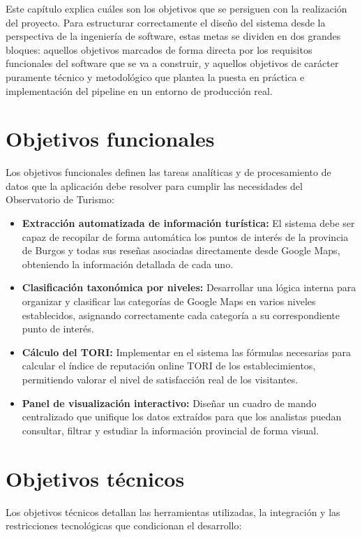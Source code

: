 
Este capítulo explica cuáles son los objetivos que se persiguen con la realización del proyecto. Para estructurar correctamente el diseño del sistema desde la perspectiva de la ingeniería de software, estas metas se dividen en dos grandes bloques: aquellos objetivos marcados de forma directa por los requisitos funcionales del software que se va a construir, y aquellos objetivos de carácter puramente técnico y metodológico que plantea la puesta en práctica e implementación del pipeline en un entorno de producción real.

\section{Objetivos funcionales}
Los objetivos funcionales definen las tareas analíticas y de procesamiento de datos que la aplicación debe resolver para cumplir las necesidades del Observatorio de Turismo:

\begin{itemize}
    \item \textbf{Extracción automatizada de información turística:} El sistema debe ser capaz de recopilar de forma automática los puntos de interés de la provincia de Burgos y todas sus reseñas asociadas directamente desde Google Maps, obteniendo la información detallada de cada uno.
    \item \textbf{Clasificación taxonómica por niveles:} Desarrollar una lógica interna para organizar y clasificar las categorías de Google Maps en varios niveles establecidos, asignando correctamente cada categoría a su correspondiente punto de interés.
    \item \textbf{Cálculo del TORI:} Implementar en el sistema las fórmulas necesarias para calcular el índice de reputación online TORI de los establecimientos, permitiendo valorar el nivel de satisfacción real de los visitantes.
    \item \textbf{Panel de visualización interactivo:} Diseñar un cuadro de mando centralizado que unifique los datos extraídos para que los analistas puedan consultar, filtrar y estudiar la información provincial de forma visual.
\end{itemize}

\section{Objetivos técnicos}
Los objetivos técnicos detallan las herramientas utilizadas, la integración y las restricciones tecnológicas que condicionan el desarrollo:

